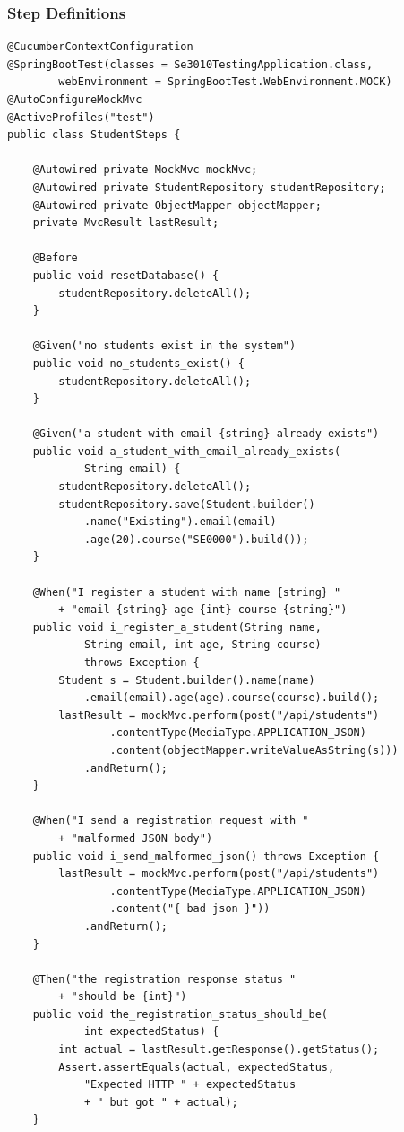 \documentclass[12pt,a4paper]{article}
\begin{document}
\subsubsection{Step Definitions}

\begin{lstlisting}[style=javastyle, caption={Cucumber step definitions -- \texttt{StudentSteps.java}}]
@CucumberContextConfiguration
@SpringBootTest(classes = Se3010TestingApplication.class,
        webEnvironment = SpringBootTest.WebEnvironment.MOCK)
@AutoConfigureMockMvc
@ActiveProfiles("test")
public class StudentSteps {

    @Autowired private MockMvc mockMvc;
    @Autowired private StudentRepository studentRepository;
    @Autowired private ObjectMapper objectMapper;
    private MvcResult lastResult;

    @Before
    public void resetDatabase() {
        studentRepository.deleteAll();
    }

    @Given("no students exist in the system")
    public void no_students_exist() {
        studentRepository.deleteAll();
    }

    @Given("a student with email {string} already exists")
    public void a_student_with_email_already_exists(
            String email) {
        studentRepository.deleteAll();
        studentRepository.save(Student.builder()
            .name("Existing").email(email)
            .age(20).course("SE0000").build());
    }

    @When("I register a student with name {string} "
        + "email {string} age {int} course {string}")
    public void i_register_a_student(String name,
            String email, int age, String course)
            throws Exception {
        Student s = Student.builder().name(name)
            .email(email).age(age).course(course).build();
        lastResult = mockMvc.perform(post("/api/students")
                .contentType(MediaType.APPLICATION_JSON)
                .content(objectMapper.writeValueAsString(s)))
            .andReturn();
    }

    @When("I send a registration request with "
        + "malformed JSON body")
    public void i_send_malformed_json() throws Exception {
        lastResult = mockMvc.perform(post("/api/students")
                .contentType(MediaType.APPLICATION_JSON)
                .content("{ bad json }"))
            .andReturn();
    }

    @Then("the registration response status "
        + "should be {int}")
    public void the_registration_status_should_be(
            int expectedStatus) {
        int actual = lastResult.getResponse().getStatus();
        Assert.assertEquals(actual, expectedStatus,
            "Expected HTTP " + expectedStatus
            + " but got " + actual);
    }


\end{lstlisting}
\end{document}
